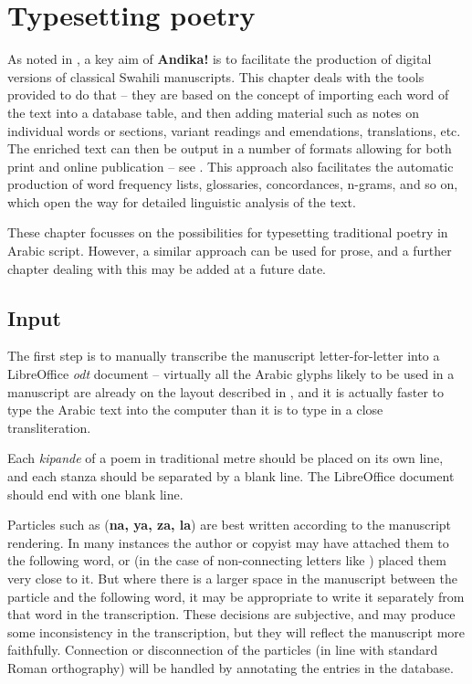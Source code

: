\chapter{Typesetting poetry}
\label{ch:poetry}

As noted in , a key aim of \textbf{Andika!} is to facilitate the production of digital versions of classical Swahili manuscripts.  This chapter deals with the tools provided to do that -- they are based on the concept of importing each word of the text into a database table, and then adding material such as notes on individual words or sections, variant readings and emendations, translations, etc.  The enriched text can then be output in a number of formats allowing for both print and online publication -- see .  This approach also facilitates the automatic production of word frequency lists, glossaries, concordances, n-grams, and so on, which open the way for detailed linguistic analysis of the text.

These chapter focusses on the possibilities for typesetting traditional poetry in Arabic script.  However, a similar approach can be used for prose, and a further chapter dealing with this may be added at a future date.


\section{Input}

The first step is to manually transcribe the manuscript letter-for-letter into a LibreOffice \textit{odt} document -- virtually all the Arabic glyphs likely to be used in a manuscript are already on the layout described in , and it is actually faster to type the Arabic text into the computer than it is to type in a close transliteration. 

Each \textit{kipande} of a poem in traditional metre should be placed on its own line, and each stanza should be separated by a blank line. The LibreOffice document should end with one blank line.

Particles such as   (\textbf{na, ya, za, la}) are best written according to the manuscript rendering. In many instances the author or copyist may have attached them to the following word, or (in the case of non-connecting letters like ) placed them very close to it. But where there is a larger space in the manuscript between the particle and the following word, it may be appropriate to write it separately from that word in the transcription. These decisions are subjective, and may produce some inconsistency in the transcription, but they will reflect the manuscript more faithfully.  Connection or disconnection of the particles (in line with standard Roman orthography) will be handled by annotating the entries in the database.

